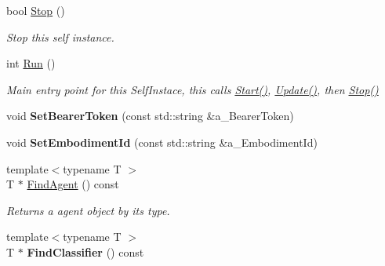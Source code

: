 \begin{DoxyCompactItemize}
\item 
\mbox{\label{class_self_instance_aed58b46328ea947d8320fd3a50fb50c3}} 
bool \hyperlink{class_self_instance_aed58b46328ea947d8320fd3a50fb50c3}{Stop} ()
\begin{DoxyCompactList}\small\item\em Stop this self instance. \end{DoxyCompactList}\item 
\mbox{\label{class_self_instance_a9fc56b9a6993f771fbcec364e21ff5e8}} 
int \hyperlink{class_self_instance_a9fc56b9a6993f771fbcec364e21ff5e8}{Run} ()
\begin{DoxyCompactList}\small\item\em Main entry point for this Self\+Instace, this calls \hyperlink{class_self_instance_ade726e276fbba8797abe0149a1a847f6}{Start()}, \hyperlink{class_self_instance_aab86fc32f63c281ad897215e0b54631e}{Update()}, then \hyperlink{class_self_instance_aed58b46328ea947d8320fd3a50fb50c3}{Stop()} \end{DoxyCompactList}\item 
\mbox{\label{class_self_instance_a92da6acbe1d35ecf72ed47285033cb7a}} 
void {\bfseries Set\+Bearer\+Token} (const std\+::string \&a\+\_\+\+Bearer\+Token)
\item 
\mbox{\label{class_self_instance_afa6c06bb9d737e3d11a69c707127727c}} 
void {\bfseries Set\+Embodiment\+Id} (const std\+::string \&a\+\_\+\+Embodiment\+Id)
\item 
\mbox{\label{class_self_instance_ad665c16bb1554d846d87136f4379baaa}} 
{\footnotesize template$<$typename T $>$ }\\T $\ast$ \hyperlink{class_self_instance_ad665c16bb1554d846d87136f4379baaa}{Find\+Agent} () const
\begin{DoxyCompactList}\small\item\em Returns a agent object by it\textquotesingle{}s type. \end{DoxyCompactList}\item 
\mbox{\label{class_self_instance_accf56af2b1cfa2376c118f24e3ba57a8}} 
{\footnotesize template$<$typename T $>$ }\\T $\ast$ {\bfseries Find\+Classifier} () const
\end{DoxyCompactItemize}
